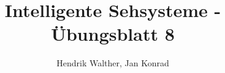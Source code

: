 \documentclass[deutsch]{llncs}
\begin{document}
\title{Intelligente Sehsysteme - Übungsblatt 8}


\author{Hendrik Walther, Jan Konrad}
\institute{}
\maketitle

\end{document}
